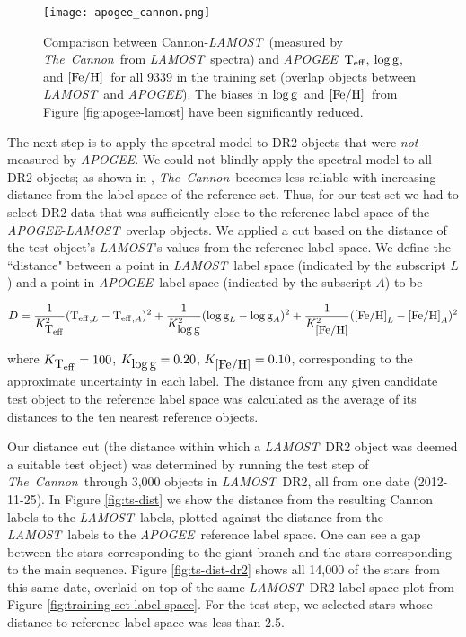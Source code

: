 \documentclass[12pt, preprint]{aastex}
\newcommand{\tc}{\textsl{The~Cannon}}
\newcommand{\apogee}{\textsl{APOGEE}}
\newcommand{\lamost}{\textsl{LAMOST}}
\newcommand{\teff}{\mbox{$\rm T_{eff}$}}
\newcommand{\feh}{\mbox{$\rm [Fe/H]$}}
\newcommand{\logg}{\mbox{$\rm \log g$}}
\begin{document}
\begin{figure}[h!]
\centering
\texttt{[image: apogee\_cannon.png]}
\caption{Comparison between Cannon-\lamost\ (measured by \tc\ from \lamost\ spectra) and \apogee\ \teff, \logg, and \feh\ for all 9339 in the training set (overlap
objects between \lamost\ and \apogee). The biases in \logg\
and \feh\ from Figure \ref{fig:apogee-lamost} have been significantly reduced.}
\label{fig:apogee-cannon}
\end{figure}

The next step is to apply the spectral model to DR2 objects that were \emph{not}
measured by \apogee. We could not blindly apply the spectral model to all 
DR2 objects; as shown
in \citet{ness2015}, \tc\ becomes less reliable with increasing distance from
the label space of the reference set. Thus, for our test set we had to select
DR2 data that was sufficiently close to the reference label space of the 
\apogee-\lamost\ overlap objects. 
We applied a cut based on the 
distance of the test object's \lamost's values from the reference label space. 
We define the ``distance" between a point in \lamost\ label space (indicated
by the subscript $L$) and a point in \apogee\ label space (indicated by the
subscript $A$) to be

\begin{equation}
D = \frac{1}{K_{\teff}^2} (\teff_{,L}-\teff_{,A})^2 + 
\frac{1}{K_{\logg}^2} (\logg_{L}-\logg_{A})^2 + 
\frac{1}{K_{\feh}^2} (\feh_{L}-\feh_{A})^2 
\end{equation}

\noindent where $K_{\teff}=100$, $K_{\logg}=0.20$, $K_{\feh}=0.10$, corresponding to the 
approximate uncertainty in each label. The distance from any given candidate test object to
the reference label space was calculated as the average of its distances to the ten
nearest reference objects. 

Our distance cut (the distance within which a \lamost\ DR2 object was deemed a suitable
test object) was determined by running the test step of \tc\ through 3,000 objects in
\lamost\ DR2, all from one date (2012-11-25). In Figure \ref{fig:ts-dist} we show the distance from the resulting Cannon labels to the \lamost\ labels, 
plotted against the distance from the \lamost\ labels to the \apogee\ reference label space. 
One can see a gap between the stars corresponding to the giant branch and the stars
corresponding to the main sequence. Figure \ref{fig:ts-dist-dr2} shows all 14,000 of the stars
from this same date, overlaid on top of the same \lamost\ DR2 label space plot from Figure \ref{fig:training-set-label-space}. For the test step, we selected stars whose distance to 
reference label space was less than 2.5. 
\end{document}
